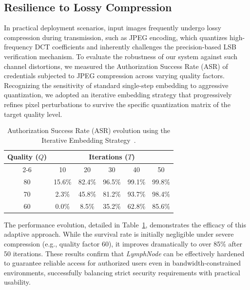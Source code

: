 \documentclass[conference]{IEEEtran}
\begin{document}
\subsection{Resilience to Lossy Compression}
In practical deployment scenarios, input images frequently undergo lossy compression during transmission, such as JPEG encoding, which quantizes high-frequency DCT coefficients and inherently challenges the precision-based LSB verification mechanism. To evaluate the robustness of our system against such channel distortions, we measured the Authorization Success Rate (ASR) of credentials subjected to JPEG compression across varying quality factors. Recognizing the sensitivity of standard single-step embedding to aggressive quantization, we adopted an iterative embedding strategy that progressively refines pixel perturbations to survive the specific quantization matrix of the target quality level. 
\begin{table}[ht]
    \centering
    \caption{Authorization Success Rate (ASR) evolution using the Iterative Embedding Strategy~\cite{liu2022loneneuron}.}
    \label{tab:jpeg_iterations}
    \small
    \setlength{\tabcolsep}{6pt}
    \renewcommand{\arraystretch}{1.2}
    
    \begin{tabular}{c|ccccc}
        \toprule
        \multirow{2}{*}{\textbf{Quality ($Q$)}} & \multicolumn{5}{c}{\textbf{Iterations ($T$)}} \\
        \cline{2-6}
         & 10 & 20 & 30 & 40 & 50 \\
        \midrule
        80 & 15.6\% & 82.4\% & 96.5\% & 99.1\% & 99.8\% \\
        70 & 2.3\%  & 45.8\% & 81.2\% & 93.7\% & 98.4\% \\
        60 & 0.0\%  & 8.5\%  & 35.2\% & 62.8\% & 85.6\% \\
        \bottomrule
    \end{tabular}
\end{table}

The performance evolution, detailed in Table~\ref{tab:jpeg_iterations}, demonstrates the efficacy of this adaptive approach. While the survival rate is initially negligible under severe compression (e.g., quality factor 60), it improves dramatically to over 85\% after 50 iterations. These results confirm that \textit{LymphNode} can be effectively hardened to guarantee reliable access for authorized users even in bandwidth-constrained environments, successfully balancing strict security requirements with practical usability.
\end{document}
